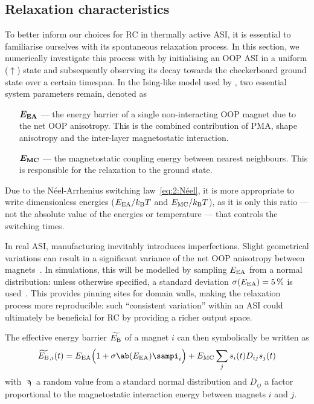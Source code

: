 \subsection{Relaxation characteristics}
\label{sec:3:relaxation}
To better inform our choices for RC in thermally active ASI, it is essential to familiarise ourselves with its spontaneous relaxation process.
In this section, we numerically investigate this process with \hotspice by initialising an OOP ASI in a uniform ($\uparrow$) state and subsequently observing its decay towards the checkerboard ground state over a certain timespan.
In the Ising-like model used by \hotspice, two essential system parameters remain, denoted as
\begin{itemize}[leftmargin=4.1em]
	\item[$\boldsymbol{E_\mathrm{EA}}$ ---] the energy barrier of a single non-interacting OOP magnet due to the net OOP anisotropy.
	This is the combined contribution of PMA, shape anisotropy and the inter-layer magnetostatic interaction.
	\item[$\boldsymbol{E_\mathrm{MC}}$ ---] the magnetostatic coupling energy between nearest neighbours.
	This is responsible for the relaxation to the ground state.
\end{itemize}
Due to the N\'eel-Arrhenius switching law~\eqref{eq:2:Néel}, it is more appropriate to write dimensionless energies ($\EEA/\kBT$ and $\EMC/\kBT$), as it is only this ratio --- not the absolute value of the energies or temperature --- that controls the switching times. \par
In real ASI, manufacturing inevitably introduces imperfections.
Slight geometrical variations can result in a significant variance of the net OOP anisotropy between magnets~\cite{Budrikis2012,DisorderGroundStateASI}.
In simulations, this will be modelled by sampling $E_\mathrm{EA}$ from a normal distribution: unless otherwise specified, a standard deviation $\sigma(E_\mathrm{EA}) = \SI{5}{\percent}$ is used~\cite{Farhan2013}.
This provides pinning sites for domain walls, making the relaxation process more reproducible: such ``consistent variation'' within an ASI could ultimately be beneficial for RC by providing a richer output space. \par
The effective energy barrier $\widetilde{E_\mathrm{B}}$ of a magnet $i$ can then symbolically be written as
\begin{equation}
	\label{eq:3:OOP_relaxation_EBeff}
	\EBeff{}_{,i}(t) = \EEA \Big(1 + \sigma\ab(\EEA) \sampi_i \Big) + \EMC \sum_j s_i(t) D_{ij} s_j(t)
\end{equation}
with $\sampi$ a random value from a standard normal distribution and $D_{ij}$ a factor proportional to the magnetostatic interaction energy between magnets $i$ and $j$. \\\par

